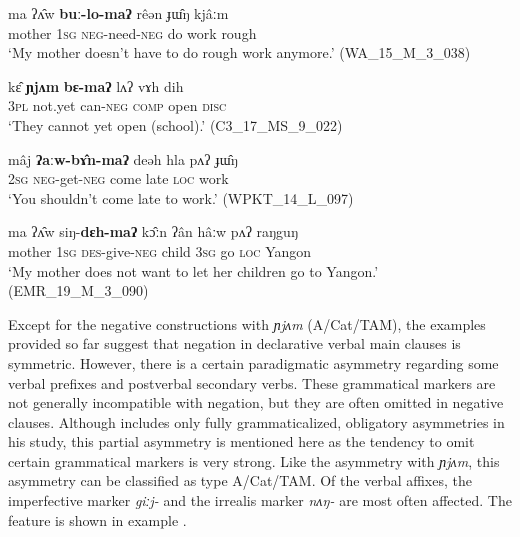 \documentclass[output=paper,colorlinks,citecolor=brown]{langscibook}
\begin{document}
\ea\label{ex:rum:12}
    \gll ma	ʔʌ̂w	\textbf{buː-lo-maʔ}	rêən	ɟɯ̂ŋ	kjâːm \\
         mother 1\textsc{sg} \textsc{neg{}-}need\textsc{{}-neg} do work rough \\
    \glt ‘My mother doesn’t have to do rough work anymore.’ (WA\_15\_M\_3\_038)
\z 

\ea\label{ex:rum:13}
    \gll kɛ̂	\textbf{ɲjʌm}	\textbf{bɛ-maʔ}	lʌʔ	vɤh	dih\\
         3\textsc{pl} not.yet can\textsc{{}-neg} \textsc{comp} open \textsc{disc} \\
    \glt ‘They cannot yet open (school).’ (C3\_17\_MS\_9\_022)
\z 

\ea\label{ex:rum:14}
    \gll mâj	\textbf{ʔaːw-bɤ̂n-maʔ}	deəh	hla	pʌʔ	ɟɯ̂ŋ\\
         2\textsc{sg} \textsc{neg{}-}get\textsc{{}-neg} come late \textsc{loc} work \\
    \glt ‘You shouldn’t come late to work.’ (WPKT\_14\_L\_097)
\z 

\ea\label{ex:rum:15}
    \gll ma	ʔʌ̂w	siŋ-\textbf{dɛh-maʔ}	kɔ̂ːn	ʔân	hâːw	pʌʔ	raŋguŋ \\
         mother 1\textsc{sg} \textsc{des{}-}give\textsc{{}-neg} child 3\textsc{sg} go \textsc{loc} Yangon \\
    \glt ‘My mother does not want to let her children go to Yangon.’ (EMR\_19\_M\_3\_090)
\z 

Except for the negative constructions with \textit{ɲjʌm} (A/Cat/TAM), the examples provided so far suggest that negation in declarative verbal main clauses is symmetric. However, there is a certain paradigmatic asymmetry \citep[52]{Miestamo2005} regarding some verbal prefixes and postverbal secondary verbs. These grammatical markers are not generally incompatible with negation, but they are often omitted in negative clauses. Although \citet[58]{Miestamo2005} includes only fully grammaticalized, obligatory asymmetries in his study, this partial asymmetry is mentioned here as the tendency to omit certain grammatical markers is very strong. Like the asymmetry with \textit{ɲjʌm}, this asymmetry can be classified as type A/Cat/TAM. Of the verbal affixes, the imperfective marker \textit{giːj-} and the irrealis marker \textit{nʌŋ-} are most often affected. The feature is shown in example .
\end{document}
